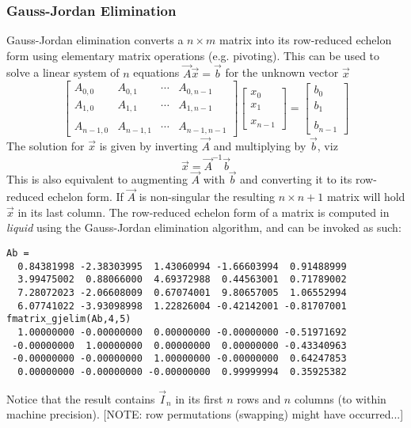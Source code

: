 \subsubsection{Gauss-Jordan Elimination}
Gauss-Jordan elimination converts a $n \times m$ matrix into its row-reduced
echelon form using elementary matrix operations (e.g. pivoting).
This can be used to solve a linear system of $n$ equations
$\vec{A}\vec{x} = \vec{b}$ for the unknown vector $\vec{x}$
\[
    \begin{bmatrix}
        A_{0,0}     & A_{0,1}   & \cdots  & A_{0,n-1} \\
        A_{1,0}     & A_{1,1}   & \cdots  & A_{1,n-1} \\
        \\
        A_{n-1,0}   & A_{n-1,1} & \cdots  & A_{n-1,n-1}
    \end{bmatrix}
    \begin{bmatrix}
        x_{0} \\
        x_{1} \\
        \\
        x_{n-1}
    \end{bmatrix}
    =
    \begin{bmatrix}
        b_{0} \\
        b_{1} \\
        \\
        b_{n-1}
    \end{bmatrix}
\]
The solution for $\vec{x}$ is given by inverting $\vec{A}$ and multiplying
by $\vec{b}$, viz
\[
    \vec{x} = \vec{A}^{-1}\vec{b}
\]
This is also equivalent to augmenting $\vec{A}$ with $\vec{b}$ and
converting it to its row-reduced echelon form.
If $\vec{A}$ is non-singular the resulting $n \times n+1$ matrix will hold
$\vec{x}$ in its last column.
The row-reduced echelon form of a matrix is computed in {\it liquid} using the
Gauss-Jordan elimination algorithm, and can be invoked as such:
\begin{verbatim}
Ab =
  0.84381998 -2.38303995  1.43060994 -1.66603994  0.91488999
  3.99475002  0.88066000  4.69372988  0.44563001  0.71789002
  7.28072023 -2.06608009  0.67074001  9.80657005  1.06552994
  6.07741022 -3.93098998  1.22826004 -0.42142001 -0.81707001
fmatrix_gjelim(Ab,4,5)
  1.00000000 -0.00000000  0.00000000 -0.00000000 -0.51971692
 -0.00000000  1.00000000  0.00000000  0.00000000 -0.43340963
 -0.00000000 -0.00000000  1.00000000 -0.00000000  0.64247853
  0.00000000 -0.00000000 -0.00000000  0.99999994  0.35925382
\end{verbatim}
Notice that the result contains $\vec{I}_n$ in its first $n$ rows and $n$
columns (to within machine precision).
[NOTE: row permutations (swapping) might have occurred...]


